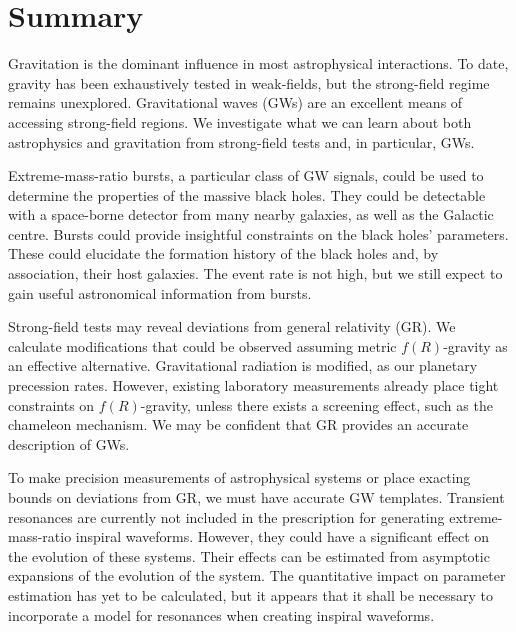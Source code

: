 \chapter{Summary}
\label{summary}

Gravitation is the dominant influence in most astrophysical interactions. To date, gravity has been exhaustively tested in weak-fields, but the strong-field regime remains unexplored. Gravitational waves (GWs) are an excellent means of accessing strong-field regions. We investigate what we can learn about both astrophysics and gravitation from strong-field tests and, in particular, GWs.

Extreme-mass-ratio bursts, a particular class of GW signals, could be used to determine the properties of the massive black holes. They could be detectable with a space-borne detector from many nearby galaxies, as well as the Galactic centre. Bursts could provide insightful constraints on the black holes' parameters. These could elucidate the formation history of the black holes and, by association, their host galaxies. The event rate is not high, but we still expect to gain useful astronomical information from bursts.

Strong-field tests may reveal deviations from general relativity (GR). We calculate modifications that could be observed assuming metric $f(R)$-gravity as an effective alternative. Gravitational radiation is modified, as our planetary precession rates. However, existing laboratory measurements already place tight constraints on $f(R)$-gravity, unless there exists a screening effect, such as the chameleon mechanism. We may be confident that GR provides an accurate description of GWs.

To make precision measurements of astrophysical systems or place exacting bounds on deviations from GR, we must have accurate GW templates. Transient resonances are currently not included in the prescription for generating extreme-mass-ratio inspiral waveforms. However, they could have a significant effect on the evolution of these systems. Their effects can be estimated from asymptotic expansions of the evolution of the system. The quantitative impact on parameter estimation has yet to be calculated, but it appears that it shall be necessary to incorporate a model for resonances when creating inspiral waveforms.